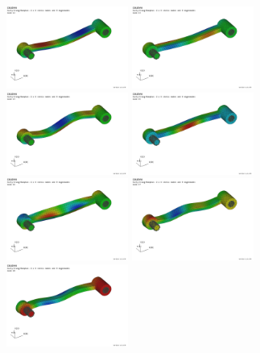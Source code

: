 \begin{figure}[tbph]
  \begin{center}
  \includegraphics[width=4cm]{figures/modesHinge/HCBmodesHingeEigenmode0}
  \includegraphics[width=4cm]{figures/modesHinge/HCBmodesHingeEigenmode1}
  \includegraphics[width=4cm]{figures/modesHinge/HCBmodesHingeEigenmode2}
  \includegraphics[width=4cm]{figures/modesHinge/HCBmodesHingeEigenmode3}\\
  \includegraphics[width=4cm]{figures/modesHinge/HCBmodesHingeEigenmode4}
  \includegraphics[width=4cm]{figures/modesHinge/HCBmodesHingeEigenmode5}
  \includegraphics[width=4cm]{figures/modesHinge/HCBmodesHingeEigenmode6}

\end{center}
\end{figure}
